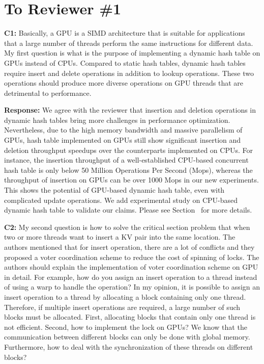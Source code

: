 \section*{To Reviewer \#1}

\begin{shaded}
	\noindent\textbf{C1:} Basically, a GPU is a SIMD architecture that is suitable for applications that a large number of threads perform the same instructions for different data. My first question is what is the purpose of implementing a dynamic hash table on GPUs instead of CPUs. Compared to static hash tables, dynamic hash tables require insert and delete operations in addition to lookup operations. These two operations should produce more diverse operations on GPU threads that are detrimental to performance.
\end{shaded}
%
\noindent\textbf{Response:} 
We agree with the reviewer that insertion and deletion operations in dynamic hash tables bring more 
challenges in performance optimization. Nevertheless, due to the high memory bandwidth and massive parallelism of GPUs, hash table implemented on GPUs still show significant insertion and deletion throughput speedups over the counterparts implemented on CPUs. For instance, the insertion throughput of a well-established CPU-based concurrent hash table \cite{li2014algorithmic} is only below 50 Million Operations Per Second (Mops), whereas the throughput of insertion on GPUs can be over 1000 Mops in our new experiments. This shows the potential of GPU-based dynamic hash table, even with complicated update operations. We add experimental study on CPU-based dynamic hash table to validate our claims. Please see Section~ for more details. 

\begin{shaded}
	\noindent\textbf{C2:} My second question is how to solve the critical section problem that when two or more threads want to insert a KV pair into the same location. The authors mentioned that for insert operation, there are a lot of conflicts and they proposed a voter coordination scheme to reduce the cost of spinning of locks. The authors should explain the implementation of voter coordination scheme on GPU in detail. For example, how do you assign an insert operation to a thread instead of using a warp to handle the operation? In my opinion, it is possible to assign an insert operation to a thread by allocating a block containing only one thread. Therefore, if multiple insert operations are required, a large number of such blocks must be allocated. First, allocating blocks that contain only one thread is not efficient. Second, how to implement the lock on GPUs? We know that the communication between different blocks can only be done with global memory. Furthermore, how to deal with the synchronization of these threads on different blocks? 
\end{shaded}

